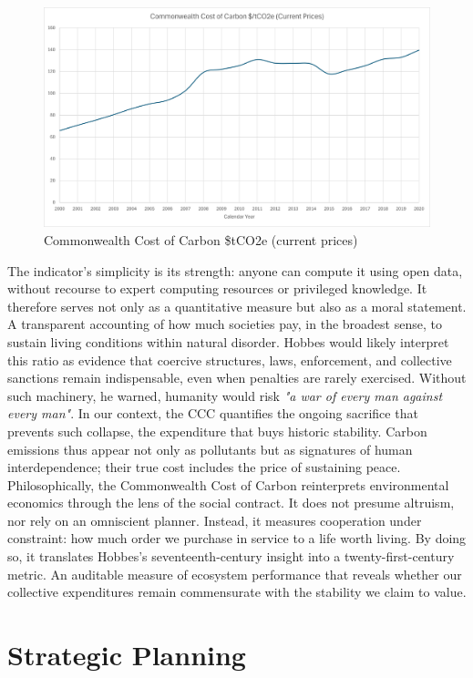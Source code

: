 \documentclass[12pt, oneside]{article}   	%
\begin{document}
\begin{figure}[H]
\centering
\includegraphics[width=1\textwidth]{ccc}
\caption{Commonwealth Cost of Carbon \$tCO2e (current prices)}
\label{CCC figure}
\end{figure}

The indicator’s simplicity is its strength: anyone can compute it using open data, without recourse to expert computing resources or privileged knowledge.
It therefore serves not only as a quantitative measure but also as a moral statement.
A transparent accounting of how much societies pay, in the broadest sense, to sustain living conditions within natural disorder.
Hobbes would likely interpret this ratio as evidence that coercive structures, laws, enforcement, and collective sanctions remain indispensable, even when penalties are rarely exercised.
Without such machinery, he warned, humanity would risk \emph{"a war of every man against every man"}.
In our context, the CCC quantifies the ongoing sacrifice that prevents such collapse, the expenditure that buys historic stability.
Carbon emissions thus appear not only as pollutants but as signatures of human interdependence; their true cost includes the price of sustaining peace.
Philosophically, the Commonwealth Cost of Carbon reinterprets environmental economics through the lens of the social contract.
It does not presume altruism, nor rely on an omniscient planner.
Instead, it measures cooperation under constraint: how much order we purchase in service to a life worth living.
By doing so, it translates Hobbes’s seventeenth-century insight into a twenty-first-century metric.
An auditable measure of ecosystem performance that reveals whether our collective expenditures remain commensurate with the stability we claim to value.\\

\section{Strategic Planning}
\end{document}
